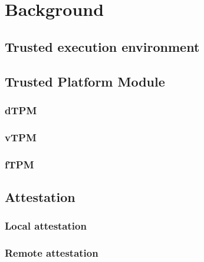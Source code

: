 \chapter{Background}\label{chapter:background}

\section{Trusted execution environment}


\section{Trusted Platform Module}
\subsection{dTPM}
\subsection{vTPM}
\subsection{fTPM}

\section{Attestation}
\subsection{Local attestation}
\subsection{Remote attestation}
